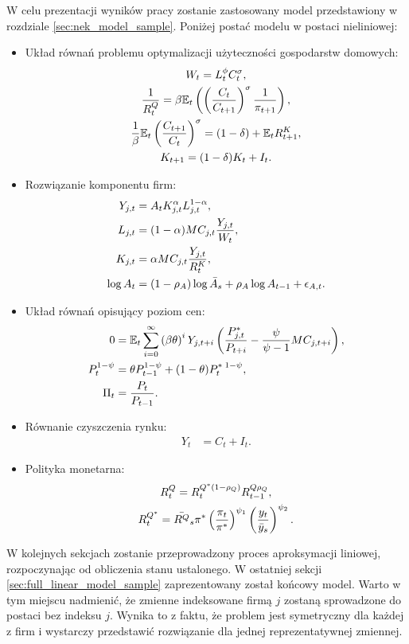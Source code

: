 W celu prezentacji wyników pracy zostanie zastosowany model przedstawiony w rozdziale \ref{sec:nek_model_sample}. Poniżej postać modelu w postaci nieliniowej:
\begin{itemize}
    \item Układ równań problemu optymalizacji użyteczności gospodarstw domowych:
        \begin{gather}
            W_t = L_t^{\phi} C_t^{\sigma}, \\
            \frac{1}{R^Q_t} = \beta \mathbb{E}_t \left( \left(\frac{C_t}{C_{t+1}}\right)^\sigma \frac{1}{\pi_{t+1}}\right), \\
            \frac{1}{\beta}\mathbb{E}_t\left(\frac{C_{t+1}}{C_t}\right)^\sigma = (1-\delta) + \mathbb{E}_t R^K_{t+1}, \\
            K_{t+1} = (1-\delta)K_t + I_t.
        \end{gather}
    \item Rozwiązanie komponentu firm:
        \begin{align}
            Y_{j,t} &= A_t K_{j,t}^\alpha L_{j,t}^{1-\alpha}, \\
            L_{j,t} &= (1-\alpha) MC_{j,t} \frac{Y_{j,t}}{W_t},\\
            K_{j,t} &= \alpha MC_{j,t} \frac{Y_{j,t}}{R^K_t},\\
            \log{A_t} &= (1-\rho_A)\log{\bar{A}_s} + \rho_A \log{A_{t-1}} + \epsilon_{A,t}.
        \end{align}
    \item Układ równań opisujący poziom cen:
        \begin{align}
            \label{eq:price_level_firm_sample}
            0 &= \mathbb{E}_t \sum_{i=0}^{\infty}\left( \beta \theta \right)^i Y_{j,t+i} \left( \frac{P^*_{j,t}}{P_{t+i}} - \frac{\psi}{\psi - 1} MC_{j,t+i}\right), \\
            \label{eq:price_level_firm_all_sample}
            P_t^{1-\psi} &= \theta P_{t-1}^{1-\psi} + (1-\theta) P_{t}^{*\;1-\psi}, \\ 
            \Pi_t &= \frac{P_t}{P_{t-1}}.
        \end{align}
    \item Równanie czyszczenia rynku:
        \begin{align}
            Y_t &= C_t + I_t.
        \end{align}
    \item Polityka monetarna:
        \begin{gather}
            R^Q_t = R_t^{Q^*(1-\rho_Q)}R_{t-1}^{Q\rho_Q}, \\
            R^{Q^*}_t = \bar{R^Q}_s \pi^* \left( \frac{\pi_t}{\pi^*}\right)^{\psi_1} \left(\frac{y_t}{\bar{y}_s}\right)^{\psi_2}.
    \end{gather}
\end{itemize}
W kolejnych sekcjach zostanie przeprowadzony proces aproksymacji liniowej, rozpoczynając od obliczenia stanu ustalonego. W ostatniej sekcji \ref{sec:full_linear_model_sample} zaprezentowany został końcowy model. Warto w tym miejscu nadmienić, że zmienne indeksowane firmą $j$ zostaną sprowadzone do postaci bez indeksu $j$. Wynika to z faktu, że problem jest symetryczny dla każdej z firm i wystarczy przedstawić rozwiązanie dla jednej reprezentatywnej zmiennej.

